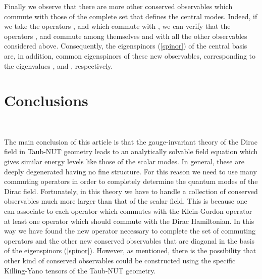 \documentclass[a4paper,12pt]{article}
\begin{document}
Finally we observe that there are more other conserved observables which 
commute with those of the complete set that defines the central modes. Indeed, 
if we take the operators \coordHE{}, \coordHE{} and \coordHE{} 
which commute with \myHighlight{$\Delta$}\coordHE{},  we can verify that the operators 
\coordHE{}, \coordHE{} and \coordHE{} 
commute among themselves and with all the other observables considered above.  
Consequently, the eigenspinors (\ref{spinor}) of the central basis are, in 
addition, common  eigenspinors of these new  observables, corresponding to the 
eigenvalues   \coordHE{}, \coordHE{} and \coordHE{}, 
respectively.

\section{Conclusions}
\

The main conclusion of this article is that the \coordHE{} gauge-invariant 
theory of the Dirac field in Taub-NUT geometry leads to an analytically 
solvable field equation which gives similar energy levels like those of the 
scalar modes. In general, these are deeply degenerated having no fine structure. 
For this reason we need to use many commuting operators in order to completely 
determine the quantum modes of the Dirac field. Fortunately, in this theory we 
have to handle a collection of conserved observables much more larger than that 
of the scalar field. This is because one can associate to each operator which 
commutes with the Klein-Gordon operator at least one operator which should 
commute with the Dirac Hamiltonian. In this way we have found the new operator 
\coordHE{} necessary to complete the  set of commuting operators  
\coordHE{}  and the other new conserved observables 
that are diagonal in the basis of the eigenspinors (\ref{spinor}). However, as 
mentioned, there is the possibility that  other kind of conserved observables 
could be constructed using the specific Killing-Yano tensors of the Taub-NUT 
geometry.      
\end{document}
